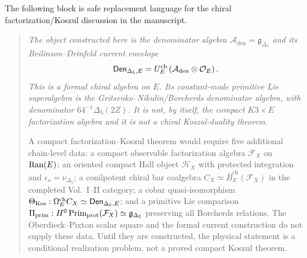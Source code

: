 The following block is safe replacement language for the chiral
factorization/Koszul discussion in the manuscript.

\begin{quote}
\itshape
The object constructed here is the denominator algebra
\(\mathcal A_{\mathrm{den}}=\mathfrak g_{\Delta_5}\) and its
Beilinson--Drinfeld current envelope
\[
\mathsf{Den}_{\Delta_5,E}
=U_E^{\mathrm{ch}}
\left(\mathcal A_{\mathrm{den}}\otimes\mathcal O_E\right).
\]
This is a formal chiral algebra on \(E\).  Its constant-mode primitive
Lie superalgebra is the Gritsenko--Nikulin/Borcherds denominator
algebra, with denominator \(64^{-1}\Delta_5(2Z)\).  It is not, by
itself, the compact \(K3\times E\) factorization algebra and it is not a
chiral Koszul-duality theorem.

A compact factorization--Koszul theorem would require five additional
chain-level data: a compact observable factorization algebra
\(\mathcal F_X\) on \(\operatorname{Ran}(E)\); an oriented compact Hall object
\(\mathcal H_X\) with protected integration and
\(\epsilon_o=\nu_{\Delta_5}\); a conilpotent chiral bar coalgebra
\(C_X\simeq\bar B_E^{\mathrm{ch}}(\mathcal F_X)\) in the completed
Vol.~I--II category; a cobar quasi-isomorphism
\(\Theta_{\mathrm{Kos}}:\Omega_E^{\mathrm{ch}}C_X\simeq
\mathsf{Den}_{\Delta_5,E}\); and a primitive Lie comparison
\(\Pi_{\mathrm{prim}}:H^0\operatorname{Prim}_{\mathrm{prot}}(\mathcal F_X)\simeq
\mathfrak g_{\Delta_5}\) preserving all Borcherds relations.  The
Oberdieck--Pixton scalar square and the formal current construction do
not supply these data.  Until they are constructed, the physical
statement is a conditional realization problem, not a proved compact
Koszul theorem.
\end{quote}
